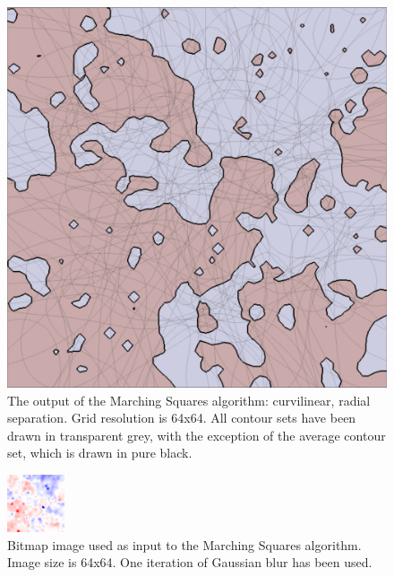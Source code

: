 \documentclass[12pt]{article}
\begin{document}
\begin{figure} 
\centering
  \includegraphics[width = 3 in]{no_blur.png}
  \caption{The output of the Marching Squares algorithm: curvilinear, radial separation. 
Grid resolution is 64x64.
All contour sets have been drawn in transparent grey, with the exception of the average contour set, which is drawn in pure black.
}
\end{figure}





\begin{figure} 
\centering
  \includegraphics[width = 3 in]{image_avg_1blur.png}
  \caption{Bitmap image used as input to the Marching Squares algorithm.
Image size is 64x64.
One iteration of Gaussian blur has been used.
}
\end{figure}
\end{document}
